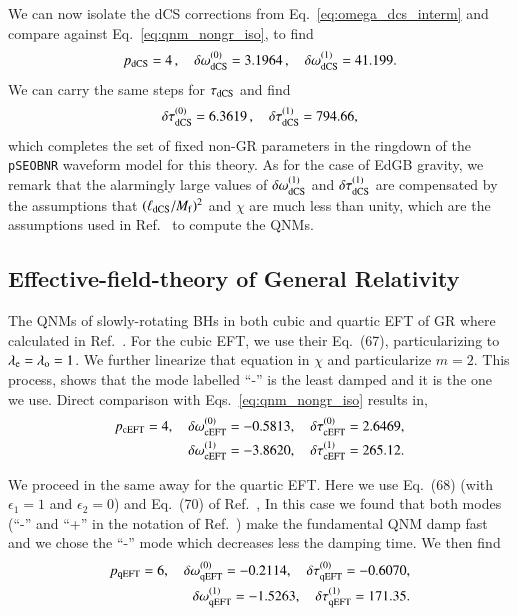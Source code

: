 \documentclass[twocolumn,
               prd,
               aps,
               superscriptaddress,
               tightenlines,
               nofootinbib,
               eqsecnum,
               amsfonts,
               amsmath,
               longbibliography]{revtex4-1}
\newcommand{\pSEOB}{\texttt{pSEOBNR}}
\newcommand{\lame}{\lambda_{\rm e}}
\newcommand{\lamo}{\lambda_{\rm o}}
\begin{document}
We can now isolate the dCS corrections from Eq.~\eqref{eq:omega_dcs_interm} and
compare against Eq.~\eqref{eq:qnm_nongr_iso}, to find
%
\begin{equation}
p_{\rm dCS} = 4\,, \quad \delta \omega^{(0)}_{\rm dCS} = 3.1964\,, \quad \delta \omega^{(1)}_{\rm dCS} = 41.199.
\label{eq:cs_omega_coefs}
\end{equation}
%
We can carry the same steps for $\tau_{\rm dCS}$ and find
%
\begin{equation}
\delta \tau^{(0)}_{\rm dCS} = 6.3619\,, \quad \delta \tau^{(1)}_{\rm dCS} = 794.66,
\label{eq:cs_tau_coefs}
\end{equation}
%
which completes the set of fixed non-GR parameters in the ringdown of the \pSEOB{} waveform model for this theory.
%
As for the case of EdGB gravity, we remark that the alarmingly large values of
$\delta \omega_{\rm dCS}^{(1)}$ and $\delta \tau_{\rm dCS}^{(1)}$ are
compensated by the assumptions that $(\ell_{\rm dCS} / M_{\rm f})^2$ and $\chi$
are much less than unity, which are the assumptions used in Ref.~\cite{Wagle:2021tam}
to compute the QNMs.

\subsection{Effective-field-theory of General Relativity}
\label{app:map_eftofgr}

The QNMs of slowly-rotating BHs in both cubic and quartic EFT of GR where calculated in Ref.~\cite{Cano:2021myl}.
%
For the cubic EFT, we use their Eq.~(67), particularizing to $\lame = \lamo = 1$.
%
We further linearize that equation in $\chi$ and particularize $m=2$.
%
This process, shows that the mode labelled ``-'' is the least damped and it is the one we use.
%
Direct comparison with Eqs.~\eqref{eq:qnm_nongr_iso} results in,
%
\begin{align}
    p_{\rm cEFT} = 4, \quad \delta \omega_{\rm cEFT}^{(0)} = - 0.5813, \quad \delta \tau_{\rm cEFT}^{(0)} = 2.6469,
    \nonumber \\
    \delta \omega_{\rm cEFT}^{(1)} = -3.8620, \quad \delta \tau_{\rm cEFT}^{(1)} = 265.12.
\end{align}

We proceed in the same away for the quartic EFT. Here we use Eq.~(68) (with
$\epsilon_{1} = 1$ and $\epsilon_{2} = 0$) and Eq.~(70) of
Ref.~\cite{Cano:2021myl},
%
In this case we found that both modes (``-'' and ``+'' in the notation of Ref.~\cite{Cano:2020cao}) make the
fundamental QNM damp fast and we chose the ``-'' mode which decreases less the damping time.
%
We then find
%
\begin{align}
    p_{\rm qEFT} = 6, \quad \delta \omega_{\rm qEFT}^{(0)} = -0.2114, \quad \delta \tau_{\rm qEFT}^{(0)} = -0.6070,
    \nonumber \\
    \delta \omega_{\rm qEFT}^{(1)} = -1.5263, \quad \delta \tau_{\rm qEFT}^{(1)} = 171.35.
\end{align}
\end{document}
